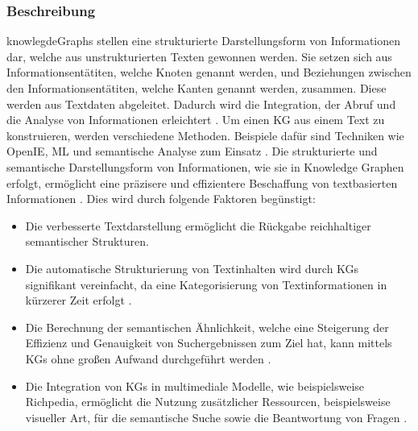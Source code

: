 \subsubsection{Beschreibung}
\ac{knowlegdeGraphs} stellen eine strukturierte Darstellungsform von Informationen dar, welche aus unstrukturierten Texten gewonnen werden. Sie setzen sich aus Informationsentätiten, welche Knoten genannt werden, und Beziehungen zwischen den Informationsentätiten, welche Kanten genannt werden, zusammen. Diese werden aus Textdaten abgeleitet. Dadurch wird die Integration, der Abruf und die Analyse von Informationen erleichtert \cite{Hojas-Mazo2018A}. Um einen KG aus einem Text zu konstruieren, werden verschiedene Methoden. Beispiele dafür sind Techniken wie \ac{OpenIE}, \ac{ML} und semantische Analyse zum Einsatz \cite{OpenIEbased}.
Die strukturierte und semantische Darstellungsform von Informationen, wie sie in Knowledge Graphen erfolgt, ermöglicht eine präzisere und effizientere Beschaffung von textbasierten Informationen \cite{Dietz2017Utilizing}. Dies wird durch folgende Faktoren begünstigt:
\begin{itemize}
    \item Die verbesserte Textdarstellung ermöglicht die Rückgabe reichhaltiger semantischer Strukturen. 
    \item Die automatische Strukturierung von Textinhalten wird durch KGs signifikant vereinfacht, da eine Kategorisierung von Textinformationen in kürzerer Zeit erfolgt \cite{Hojas-Mazo2018A}.
    \item Die Berechnung der semantischen Ähnlichkeit, welche eine Steigerung der Effizienz und Genauigkeit von Suchergebnissen zum Ziel hat, kann mittels KGs ohne großen Aufwand durchgeführt werden \cite{Wang2018Information}.
    \item Die Integration von KGs in multimediale Modelle, wie beispielsweise Richpedia, ermöglicht die Nutzung zusätzlicher Ressourcen, beispielsweise visueller Art, für die semantische Suche sowie die Beantwortung von Fragen \cite{Wang2020Richpedia:}.
\end{itemize}

